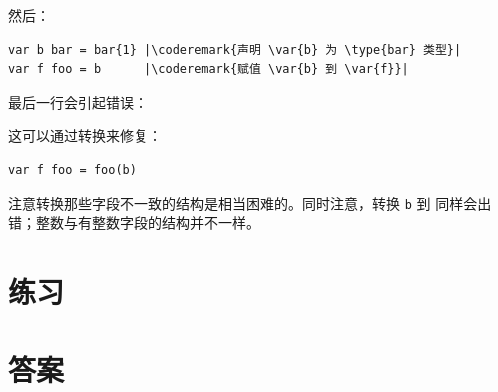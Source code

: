 然后：
\begin{lstlisting}
var b bar = bar{1} |\coderemark{声明 \var{b} 为 \type{bar} 类型}|
var f foo = b	   |\coderemark{赋值 \var{b} 到 \var{f}}|
\end{lstlisting}
最后一行会引起错误：

\noindent{}

\noindent{}这可以通过转换来修复：
\begin{lstlisting}
var f foo = foo(b)
\end{lstlisting}
注意转换那些字段不一致的结构是相当困难的。同时注意，转换
\lstinline{b} 到  同样会出错；整数与有整数字段的结构并不一样。

\section{练习}










\cleardoublepage
\section{答案}
\shipoutAnswer
